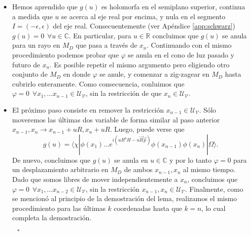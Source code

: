 \begin{itemize}
\item Hemos aprendido que $g(u)$ es holomorfa en el semiplano superior, continua a medida que $u$ se acerca al eje real por encima, y nula en el segmento $I=(-\epsilon,\epsilon)$ del eje real. Consecuentemente (ver Apéndice \ref{app:schwarz}) $g(u)=0\:\:\forall u\in \mathbb{C}$. En particular, para $u\in \mathbb{R}$ concluimos que $g(u)$ se anula para un rayo en $M_D$ que pasa a través de $x_n$. Continuando con el mismo procedimiento podemos probar que $\varphi$ se anula en el cono de luz pasado y futuro de $x_n$. Es posible repetir el mismo argumento pero eligiendo otro conjunto de $M_D$ en donde $\varphi$ se anule, y comenzar a zig-zagear en $M_D$ hasta cubrirlo enteramente. Como consecuencia, conluimos que $\varphi=0\:\:\forall x_1,\ldots x_{n-1}\in \mathcal{U}_{\mathcal{V}}$, sin la restricción de que $x_n\in \mathcal{U}_{\mathcal{V}}$.
\item El próximo paso consiste en remover la restricción $x_{n-1}\in \mathcal{U}_{\mathcal{V}}$. Sólo moveremos las últimas dos variable de forma similar al paso anterior $x_{n-1},x_n\rightarrow x_{n-1}+uR,x_n+uR$. Luego, puede verse que
\begin{equation}
g(u)=\langle \chi|\phi(x_1)\ldots e^{i(uR^0H-u\vec{R}\vec{p})} \phi(x_{n-1})\phi(x_n)|\Omega \rangle.
\end{equation}
De nuevo, concluimos que $g(u)$ se anula en $u\in \mathbb{C}$ y por lo tanto $\varphi=0$ para un desplazamiento arbitrario en $M_D$ de ambos $x_{n-1},x_n$ al mismo tiempo. Dado que somos libres de mover independientemente a $x_n$, concluimos que $\varphi=0\:\:\forall x_1,\ldots x_{n-2}\in \mathcal{U}_{\mathcal{V}}$, sin la restricción $x_{n-1},x_n\in \mathcal{U}_{\mathcal{V}}$. Finalmente, como se mencionó al principio de la demostración del lema, realizamos el mismo procedimiento para las últimas $k$ coordenadas hasta que $k=n$, lo cual completa la demostración.
\end{itemize}
$\:\:\:\:\:\:\:\:\:\:\:\square$

